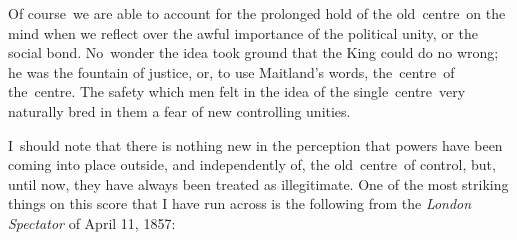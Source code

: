 \documentclass[openany,nobib]{tufte-book}
\begin{document}
Of course~we are able to account for the prolonged hold of the
old~centre~on the mind when we reflect over the awful importance of the
political unity, or the social bond. No~wonder the idea took ground that
the King could do no wrong; he was the fountain of justice, or, to use
Maitland's words, the~centre~of the~centre. The safety which men felt in
the idea of the single~centre~very naturally bred in them a fear of new
controlling unities.~

I~should note that there is nothing new in the perception that powers
have been coming into place outside, and independently of, the
old~centre~of control, but, until now, they have always been treated as
illegitimate. One of the most striking things on this score that I have
run across is the following from the \emph{London Spectator} of April
11, 1857:~
\end{document}
